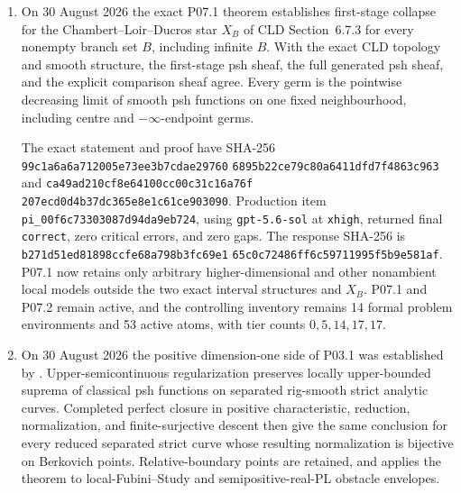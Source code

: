 \begin{enumerate}
  The principal live statement and proof have SHA-256
  \texttt{0d95354a4cd2bd15d03020dde630779f4}
  \allowbreak\texttt{f423b73e9661eb8e65e0511dc765e24} and
  \texttt{9cab2f0f679b095b00b2d9f760a4a531}
  \allowbreak\texttt{5d3a24fe7b295a9d0a9bf414d91e434a}.
  The dependency-closed materialized statement and proof have SHA-256
  \texttt{0ba26fe924a065af31198cfc74aa44e79}
  \allowbreak\texttt{0feb128159eef24458f8ca0b151f8b4} and
  \texttt{cdce552b3750faed4dfbb6a0284405094}
  \allowbreak\texttt{be10b56c138363482cca0464e20f4af}.
  Production item
  \texttt{pi\_87b42b938a8d830222bed78f}, using
  \texttt{gpt-5.6-sol} at \texttt{xhigh}, returned final
  \texttt{correct}, zero critical errors, and zero gaps.  The proof digest
  equals the materialized proof hash.  This is a verified book-level
  synthesis, not a novelty or priority claim.  The controlling inventory is
  now 14 formal problem environments and 53 active atoms, with tier counts
  \(0,5,14,17,17\).
\item On 30 August 2026 the exact P07.1 theorem establishes first-stage
  collapse for the Chambert--Loir--Ducros star \(X_B\) of CLD
  Section~6.7.3 for every nonempty branch set \(B\), including infinite
  \(B\).  With the exact CLD topology and smooth structure, the first-stage
  psh sheaf, the full generated psh sheaf, and the explicit comparison sheaf
  agree.  Every germ is the pointwise decreasing limit of smooth psh
  functions on one fixed neighbourhood, including centre and
  \(-\infty\)-endpoint germs.

  The exact statement and proof have SHA-256
  \texttt{99c1a6a6a712005e73ee3b7cdae29760}
  \allowbreak\texttt{6895b22ce79c80a6411dfd7f4863c963} and
  \texttt{ca49ad210cf8e64100cc00c31c16a76f}
  \allowbreak\texttt{207ecd0d4b37dc365e8e1c61ce903090}.
  Production item
  \texttt{pi\_00f6c73303087d94da9eb724}, using
  \texttt{gpt-5.6-sol} at \texttt{xhigh}, returned final
  \texttt{correct}, zero critical errors, and zero gaps.  The response
  SHA-256 is
  \texttt{b271d51ed81898ccfe68a798b3fc69e1}
  \allowbreak\texttt{65c0c72486ff6c59711995f5b9e581af}.
  P07.1 now retains only arbitrary higher-dimensional and other nonambient
  local models outside the two exact interval structures and \(X_B\).
  P07.1 and P07.2 remain active, and the controlling inventory remains 14
  formal problem environments and 53 active atoms, with tier counts
  \(0,5,14,17,17\).
\item On 30 August 2026 the positive dimension-one side of P03.1 was
  established by
  .  Upper-semicontinuous
  regularization preserves locally upper-bounded suprema of classical psh
  functions on separated rig-smooth strict analytic curves.  Completed
  perfect closure in positive characteristic, reduction, normalization, and
  finite-surjective descent then give the same conclusion for every reduced
  separated strict curve whose resulting normalization is bijective on
  Berkovich points.  Relative-boundary points are retained, and
   applies the theorem
  to local-Fubini--Study and semipositive-real-PL obstacle envelopes.


\end{enumerate}
